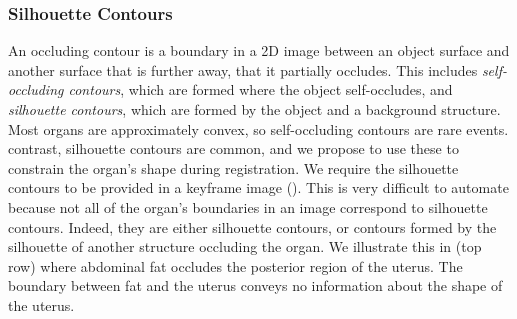 


\subsubsection{Silhouette Contours}
An occluding contour is a boundary in a 2D image between an object surface and another surface that is further away, that it partially occludes. This includes  \emph{self-occluding contours}, which are formed where the object self-occludes, and \emph{silhouette contours}, which are formed by the object and a background structure. Most organs are approximately convex, so self-occluding contours are rare events.  contrast, silhouette contours are common, and we propose to use these to constrain the organ's shape during registration. We require the silhouette contours to be provided in a keyframe image (). This is very difficult to automate because not all of the organ's boundaries in an image correspond to silhouette contours. Indeed, they are either silhouette contours, or contours formed by the silhouette of another structure occluding the organ. We illustrate this in  (top row) where abdominal fat occludes the posterior region of the uterus. The boundary between fat and the uterus conveys no information about the shape of the uterus.  

